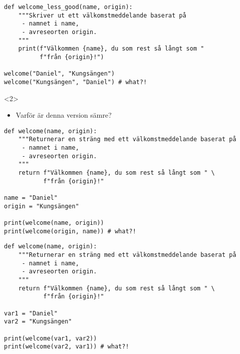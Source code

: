 \begin{frame}[fragile]
  \begin{example}
    \begin{verbatim}
def welcome_less_good(name, origin):
    """Skriver ut ett välkomstmeddelande baserat på
     - namnet i name,
     - avreseorten origin.
    """
    print(f"Välkommen {name}, du som rest så långt som "
          f"från {origin}!")

welcome("Daniel", "Kungsängen")
welcome("Kungsängen", "Daniel") # what?!
    \end{verbatim}
  \end{example}

  \begin{onlyenv}<2>
    \begin{exercise}
      \begin{itemize}
        \item Varför är denna version sämre?
      \end{itemize}
    \end{exercise}
  \end{onlyenv}
\end{frame}

\begin{frame}[fragile]
  \begin{example}
    \begin{verbatim}
def welcome(name, origin):
    """Returnerar en sträng med ett välkomstmeddelande baserat på
     - namnet i name,
     - avreseorten origin.
    """
    return f"Välkommen {name}, du som rest så långt som " \
           f"från {origin}!"

name = "Daniel"
origin = "Kungsängen"

print(welcome(name, origin))
print(welcome(origin, name)) # what?!
    \end{verbatim}
  \end{example}
\end{frame}

\begin{frame}[fragile]
  \begin{example}
    \begin{verbatim}
def welcome(name, origin):
    """Returnerar en sträng med ett välkomstmeddelande baserat på
     - namnet i name,
     - avreseorten origin.
    """
    return f"Välkommen {name}, du som rest så långt som " \
           f"från {origin}!"

var1 = "Daniel"
var2 = "Kungsängen"

print(welcome(var1, var2))
print(welcome(var2, var1)) # what?!
    \end{verbatim}
  \end{example}
\end{frame}

